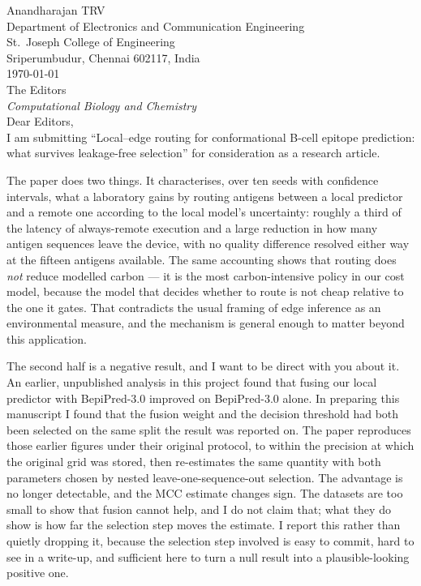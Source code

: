 \documentclass[11pt,a4paper]{article}
\begin{document}
\noindent Anandharajan TRV\\
Department of Electronics and Communication Engineering\\
St.\ Joseph College of Engineering\\
Sriperumbudur, Chennai 602117, India\\[1em]
\noindent \today\\[1.5em]

\noindent The Editors\\
\emph{Computational Biology and Chemistry}\\[1.5em]

\noindent Dear Editors,\\[0.8em]

I am submitting ``Local--edge routing for conformational B-cell epitope
prediction: what survives leakage-free selection'' for consideration as a
research article.

The paper does two things. It characterises, over ten seeds with confidence
intervals, what a laboratory gains by routing antigens between a local
predictor and a remote one according to the local model's uncertainty: roughly
a third of the latency of always-remote execution and a large reduction in how
many antigen sequences leave the device, with no quality difference resolved
either way at the fifteen antigens available. The same
accounting shows that routing does \emph{not} reduce modelled carbon --- it is
the most carbon-intensive policy in our cost model, because the model that decides
whether to route is not cheap relative to the one it gates. That contradicts
the usual framing of edge inference as an environmental measure, and the
mechanism is general enough to matter beyond this application.

The second half is a negative result, and I want to be direct with you about
it. An earlier, unpublished analysis in this project found that fusing our
local predictor with BepiPred-3.0 improved on BepiPred-3.0 alone. In preparing
this manuscript I found that the fusion weight and the decision threshold had
both been selected on the same split the result was reported on. The paper
reproduces those earlier figures under their original protocol, to within the
precision at which the original grid was stored, then re-estimates the same
quantity with both parameters chosen by nested leave-one-sequence-out
selection. The advantage is no longer detectable, and the MCC estimate changes
sign. The datasets are too small to show that fusion cannot help, and I do not
claim that; what they do show is how far the selection step moves the
estimate. I report this rather than quietly dropping it, because the selection
step involved is easy to commit, hard to see in a write-up, and sufficient here
to turn a null result into a plausible-looking positive one.
\end{document}
